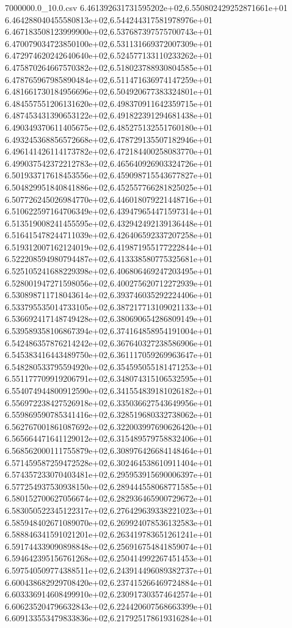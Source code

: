 \begin{filecontents*}{7000000.0_10.0.csv}
6.461392631731595202e+02,6.550802429252871661e+01
6.464288040455580813e+02,6.544244317581978976e+01
6.467183508123999900e+02,6.537687397575700743e+01
6.470079034723850100e+02,6.531131669372007309e+01
6.472974620242640640e+02,6.524577133110233262e+01
6.475870264667570382e+02,6.518023788930804585e+01
6.478765967985890484e+02,6.511471636974147259e+01
6.481661730184956696e+02,6.504920677383324801e+01
6.484557551206131620e+02,6.498370911642359715e+01
6.487453431390653122e+02,6.491822391294681438e+01
6.490349370611405675e+02,6.485275132551760180e+01
6.493245368856572668e+02,6.478729135507182946e+01
6.496141426114173782e+02,6.472184400258083770e+01
6.499037542372212783e+02,6.465640926903324726e+01
6.501933717618453556e+02,6.459098715543677827e+01
6.504829951840841886e+02,6.452557766281825025e+01
6.507726245026984770e+02,6.446018079221448716e+01
6.510622597164706349e+02,6.439479654471597314e+01
6.513519008241455595e+02,6.432942492139136448e+01
6.516415478244711039e+02,6.426406592337207258e+01
6.519312007162124019e+02,6.419871955177222844e+01
6.522208594980794487e+02,6.413338580775325681e+01
6.525105241688229398e+02,6.406806469247203495e+01
6.528001947271598056e+02,6.400275620712272939e+01
6.530898711718043614e+02,6.393746035292224406e+01
6.533795535014733105e+02,6.387217713109021133e+01
6.536692417148749428e+02,6.380690654286809149e+01
6.539589358106867394e+02,6.374164858954191004e+01
6.542486357876214242e+02,6.367640327238586906e+01
6.545383416443489750e+02,6.361117059269963647e+01
6.548280533795594920e+02,6.354595055181471253e+01
6.551177709919206791e+02,6.348074315106532595e+01
6.554074944800912590e+02,6.341554839181026182e+01
6.556972238427526918e+02,6.335036627543649956e+01
6.559869590785341416e+02,6.328519680332738062e+01
6.562767001861087692e+02,6.322003997690626420e+01
6.565664471641129012e+02,6.315489579758832406e+01
6.568562000111755879e+02,6.308976426684148464e+01
6.571459587259472528e+02,6.302464538610911404e+01
6.574357233070403481e+02,6.295953915690006397e+01
6.577254937530938150e+02,6.289444558068771585e+01
6.580152700627056674e+02,6.282936465900729672e+01
6.583050522345122317e+02,6.276429639338221023e+01
6.585948402671089070e+02,6.269924078536132583e+01
6.588846341591021201e+02,6.263419783651261241e+01
6.591744339090898848e+02,6.256916754841859074e+01
6.594642395156761268e+02,6.250414992267451453e+01
6.597540509774388511e+02,6.243914496089382737e+01
6.600438682929708420e+02,6.237415266469724884e+01
6.603336914608499910e+02,6.230917303574642574e+01
6.606235204796632843e+02,6.224420607568663399e+01
6.609133553479833836e+02,6.217925178619316284e+01

\end{filecontents*}
